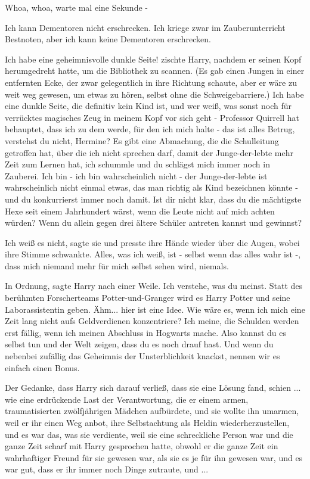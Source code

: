 \glqq{}Whoa, whoa, warte mal eine Sekunde -\grqq{}

\glqq{}Ich kann Dementoren nicht erschrecken. Ich kriege zwar im Zauberunterricht
Bestnoten, aber ich kann keine Dementoren erschrecken.\grqq{}

\glqq{}Ich habe eine geheimnisvolle dunkle Seite!\grqq{} zischte Harry, nachdem
er seinen Kopf herumgedreht hatte, um die Bibliothek zu scannen. (Es gab einen
Jungen in einer entfernten Ecke, der zwar gelegentlich in ihre Richtung schaute,
aber er wäre zu weit weg gewesen, um etwas zu hören, selbst ohne die
Schweigebarriere.) \glqq{}Ich habe eine dunkle Seite, die definitiv kein Kind
ist, und wer weiß, was sonst noch für verrücktes magisches Zeug in meinem Kopf
vor sich geht - Professor Quirrell hat behauptet, dass ich zu dem werde, für den
ich mich halte - das ist alles Betrug, verstehst du nicht, Hermine? Es gibt eine
Abmachung, die die Schulleitung getroffen hat, über die ich nicht sprechen darf,
damit der Junge-der-lebte mehr Zeit zum Lernen hat, ich schummle und du schlägst
mich immer noch in Zauberei. Ich bin - ich bin wahrscheinlich nicht - der
Junge-der-lebte ist wahrscheinlich nicht einmal etwas, das man richtig als Kind
bezeichnen könnte - und du konkurrierst immer noch damit. Ist dir nicht klar,
dass du die mächtigste Hexe seit einem Jahrhundert wärst, wenn die Leute nicht
auf mich achten würden? Wenn du allein gegen drei ältere Schüler antreten kannst
und gewinnst?\grqq{}

\glqq{}Ich weiß es nicht\grqq{}, sagte sie und presste ihre Hände wieder über die
Augen, wobei ihre Stimme schwankte. \glqq{}Alles, was ich weiß, ist - selbst wenn
das alles wahr ist -, dass mich niemand mehr für mich selbst sehen wird,
niemals.\grqq{}

\glqq{}In Ordnung\grqq{}, sagte Harry nach einer Weile. \glqq{}Ich verstehe, was
du meinst. Statt des berühmten Forscherteams Potter-und-Granger wird es Harry
Potter und seine Laborassistentin geben. Ähm... hier ist eine Idee. Wie wäre es,
wenn ich mich eine Zeit lang nicht aufs Geldverdienen konzentriere? Ich meine,
die Schulden werden erst fällig, wenn ich meinen Abschluss in Hogwarts mache.
Also kannst du es selbst tun und der Welt zeigen, dass du es noch drauf hast.
Und wenn du nebenbei zufällig das Geheimnis der Unsterblichkeit knackst, nennen
wir es einfach einen Bonus.\grqq{}

Der Gedanke, dass Harry sich darauf verließ, dass sie eine Lösung fand, schien
... wie eine erdrückende Last der Verantwortung, die er einem armen,
traumatisierten zwölfjährigen Mädchen aufbürdete, und sie wollte ihn umarmen,
weil er ihr einen Weg anbot, ihre Selbstachtung als Heldin wiederherzustellen,
und es war das, was sie verdiente, weil sie eine schreckliche Person war und die
ganze Zeit scharf mit Harry gesprochen hatte, obwohl er die ganze Zeit ein
wahrhaftiger Freund für sie gewesen war, als sie es je für ihn gewesen war, und
es war gut, dass er ihr immer noch Dinge zutraute, und ...

